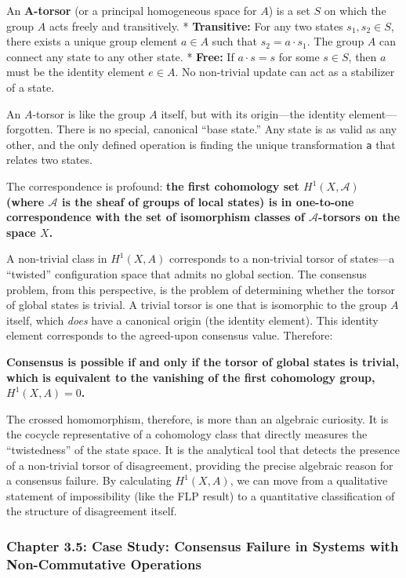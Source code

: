\documentclass[
]{article}
\begin{document}
An \textbf{A-torsor} (or a principal homogeneous space for \(A\)) is a
set \(S\) on which the group \(A\) acts freely and transitively. *
\textbf{Transitive:} For any two states \(s_1, s_2 \in S\), there exists
a unique group element \(a \in A\) such that \(s_2 = a \cdot s_1\). The
group \(A\) can connect any state to any other state. * \textbf{Free:}
If \(a \cdot s = s\) for some \(s \in S\), then \(a\) must be the
identity element \(e \in A\). No non-trivial update can act as a
stabilizer of a state.

An \(A\)-torsor is like the group \(A\) itself, but with its
origin---the identity element---forgotten. There is no special,
canonical ``base state.'' Any state is as valid as any other, and the
only defined operation is finding the unique transformation \texttt{a}
that relates two states.

The correspondence is profound: \textbf{the first cohomology set
\(H^1(X, \mathcal{A})\) (where \(\mathcal{A}\) is the sheaf of groups of
local states) is in one-to-one correspondence with the set of
isomorphism classes of \(\mathcal{A}\)-torsors on the space \(X\).}

A non-trivial class in \(H^1(X, A)\) corresponds to a non-trivial torsor
of states---a ``twisted'' configuration space that admits no global
section. The consensus problem, from this perspective, is the problem of
determining whether the torsor of global states is trivial. A trivial
torsor is one that is isomorphic to the group \(A\) itself, which
\emph{does} have a canonical origin (the identity element). This
identity element corresponds to the agreed-upon consensus value.
Therefore:

\textbf{Consensus is possible if and only if the torsor of global states
is trivial, which is equivalent to the vanishing of the first cohomology
group, \(H^1(X, A) = 0\).}

The crossed homomorphism, therefore, is more than an algebraic
curiosity. It is the cocycle representative of a cohomology class that
directly measures the ``twistedness'' of the state space. It is the
analytical tool that detects the presence of a non-trivial torsor of
disagreement, providing the precise algebraic reason for a consensus
failure. By calculating \(H^1(X, A)\), we can move from a qualitative
statement of impossibility (like the FLP result) to a quantitative
classification of the structure of disagreement itself.

\subsubsection{Chapter 3.5: Case Study: Consensus Failure in Systems
with Non-Commutative
Operations}\label{chapter-3.5-case-study-consensus-failure-in-systems-with-non-commutative-operations}
\end{document}
